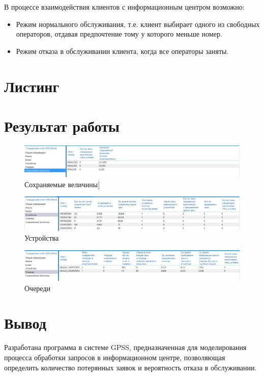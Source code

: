 \documentclass[a4paper,oneside,12pt]{extreport}
\begin{document}
В процессе взаимодействия клиентов с информационным центром возможно:
\begin{itemize}
	\item Режим нормального обслуживания, т.е. клиент выбирает одного из свободных операторов, отдавая предпочтение тому у которого меньше номер.
	\item Режим отказа в обслуживании клиента, когда все операторы заняты.
\end{itemize}

\chapter{Листинг}



\chapter{Результат работы}

\begin{figure}[H]
	\centering
	\includegraphics[width=\linewidth]{inc/img/result-values.jpg}
	\caption{Сохраняемые величины]}
\end{figure}

\begin{figure}[H]
	\centering
	\includegraphics[width=\linewidth]{inc/img/result-devices.jpg}
	\caption{Устройства}
\end{figure}

\begin{figure}[H]
	\centering
	\includegraphics[width=\linewidth]{inc/img/result-queues.jpg}
	\caption{Очереди}
\end{figure}

\chapter*{Вывод}

Разработана программа в системе GPSS, предназначенная для моделирования процесса обработки запросов в информационном центре, позволяющая определить количество потерянных заявок и вероятность отказа в обслуживании.
\end{document}
